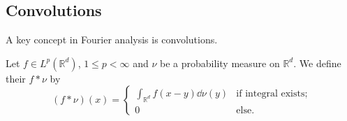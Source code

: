

\subsection{Convolutions}

A key concept in Fourier analysis is convolutions.

\begin{definition}[Convolution]
	Let $f \in L^p(\mathbb R^d)$, $1 \leq p < \infty$ and $\nu$ be a probability measure on $\mathbb R^d$.
	We define their  $f \ast \nu$ by
	\[ (f \ast \nu)(x) = \begin{cases}
		\int_{\mathbb R^d} f(x-y) \dd{\nu(y)} & \text{if integral exists;} \\
		0 & \text{else.}
	\end{cases} \]
\end{definition}

